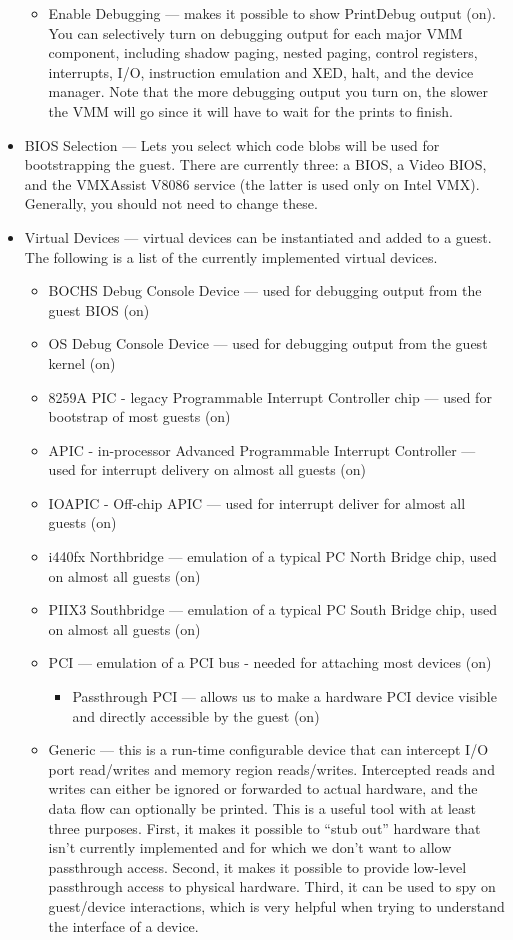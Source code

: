 \documentclass[11pt]{article}
\begin{document}
\begin{itemize}
\begin{itemize}
\item Enable Debugging --- makes it possible to show PrintDebug output
(on).   You can selectively turn on debugging output for each major
VMM component, including shadow paging, nested paging, control
registers, interrupts, I/O, instruction emulation and XED, halt, and
the device manager.   Note that the more debugging output you turn on,
the slower the VMM will go since it will have to wait for the prints
to finish. 
\end{itemize}
\item BIOS Selection --- Lets you select which code blobs will be
used for bootstrapping the guest.   There are currently three:  a
BIOS, a Video BIOS, and the VMXAssist V8086 service (the latter is used only on
Intel VMX).   Generally, you should not need to change these.
\item Virtual Devices --- virtual devices can be instantiated and
added to a guest.   The following is a list of the currently
implemented virtual devices.
\begin{itemize}
\item BOCHS Debug Console Device --- used for debugging output from
the guest BIOS (on)
\item OS Debug Console Device --- used for debugging output from
the guest kernel (on)
\item 8259A PIC - legacy Programmable Interrupt Controller chip --- used
for bootstrap of most guests (on)
\item APIC - in-processor Advanced Programmable Interrupt Controller --- used
for interrupt delivery on almost all guests (on)
\item IOAPIC - Off-chip APIC  --- used for interrupt deliver for almost
all guests (on)
\item i440fx Northbridge --- emulation of a typical PC North Bridge
chip, used on almost all guests (on)
\item PIIX3 Southbridge --- emulation of a typical PC South Bridge
chip, used on almost all guests (on)
\item PCI --- emulation of a PCI bus - needed for attaching most
devices (on)   
\begin{itemize}
\item Passthrough PCI --- allows us to make a hardware PCI device visible and
directly accessible by the guest (on)
\end{itemize}
\item Generic --- this is a run-time configurable device that can intercept I/O port read/writes and memory region reads/writes.   Intercepted reads and writes can either be ignored or forwarded to actual hardware, and the data flow can optionally be printed.   This is a useful tool with at least three purposes.  First, it makes it possible to ``stub out'' hardware that isn't currently implemented and for which we don't want to allow passthrough access. Second, it makes it possible to provide low-level passthrough access to physical hardware.   Third, it can be used to spy on guest/device interactions, which is very helpful when trying to understand the interface of a device.

\end{itemize}
\end{itemize}
\end{document}
